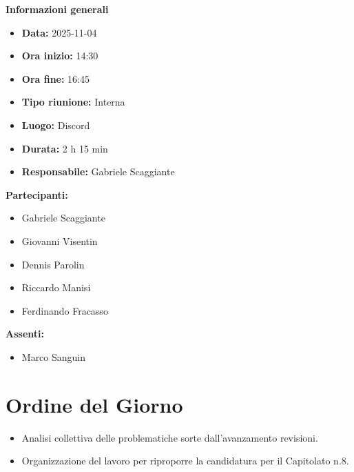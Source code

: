 \documentclass[a4paper,12pt]{article}
\begin{document}
\clearpage
{\large \textbf{Informazioni generali}}
{\footnotesize
{}

\begin{itemize}
    \item \textbf{Data:} 2025-11-04
    \item \textbf{Ora inizio:} 14:30
    \item \textbf{Ora fine:} 16:45
    \item \textbf{Tipo riunione:} Interna
    \item \textbf{Luogo:} Discord
    \item \textbf{Durata:} 2 h 15 min
    \item \textbf{Responsabile:} Gabriele Scaggiante
\end{itemize}

\vspace{0.2cm}

\textbf{Partecipanti:}
\begin{itemize}
    \item Gabriele Scaggiante
    \item Giovanni Visentin
    \item Dennis Parolin 
    \item Riccardo Manisi
    \item Ferdinando Fracasso
\end{itemize}

\textbf{Assenti:}
\begin{itemize}
    \item Marco Sanguin
\end{itemize}
}

\vspace{0.5cm}

\vspace{0.8cm}

\clearpage
\tableofcontents
\thispagestyle{empty} %
\clearpage

\section{Ordine del Giorno}
\begin{itemize}
    \item Analisi collettiva delle problematiche sorte dall'avanzamento revisioni.
    \item Organizzazione del lavoro per riproporre la candidatura per il Capitolato n.8.
\end{itemize}
\end{document}
